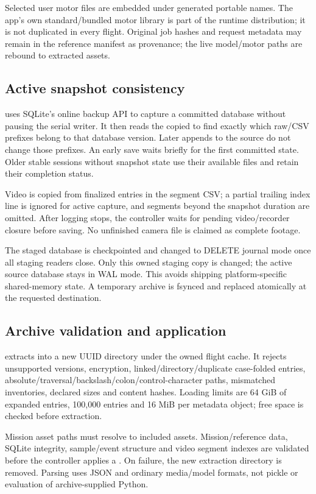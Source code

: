 Selected user motor files are embedded under generated portable names. The
app's own standard/bundled motor library is part of the runtime distribution;
it is not duplicated in every flight. Original job hashes and request metadata
may remain in the reference manifest as provenance; the live model/motor paths
are rebound to extracted assets.

\subsection{Active snapshot consistency}

 uses SQLite's online backup API to capture a committed
database without pausing the serial writer. It then reads the copied
 to find exactly which raw/CSV prefixes belong to that
database version. Later appends to the source do not change those prefixes.
An early save waits briefly for the first committed state. Older stable sessions
without snapshot state use their available files and retain their completion
status.

Video is copied from finalized entries in the segment CSV; a partial trailing
index line is ignored for active capture, and segments beyond the snapshot
duration are omitted. After logging stops, the controller waits for pending
video/recorder closure before saving. No unfinished camera file is claimed as
complete footage.

The staged database is checkpointed and changed to DELETE journal mode once all
staging readers close. Only this owned staging copy is changed; the active
source database stays in WAL mode. This avoids shipping platform-specific
shared-memory state. A temporary archive is fsynced and replaced atomically at
the requested destination.

\subsection{Archive validation and application}
 extracts into a new UUID directory under the owned flight
cache. It rejects unsupported versions, encryption, linked/directory/duplicate
case-folded entries, absolute/traversal/backslash/colon/control-character paths,
mismatched inventories, declared sizes and content hashes. Loading limits are
64 GiB of expanded entries, 100,000 entries and 16 MiB per metadata object; free
space is checked before extraction.

Mission asset paths must resolve to included assets. Mission/reference data,
SQLite integrity, sample/event structure and video segment indexes are validated
before the controller applies a . On failure, the new
extraction directory is removed. Parsing uses JSON and ordinary media/model
formats, not pickle or evaluation of archive-supplied Python.

